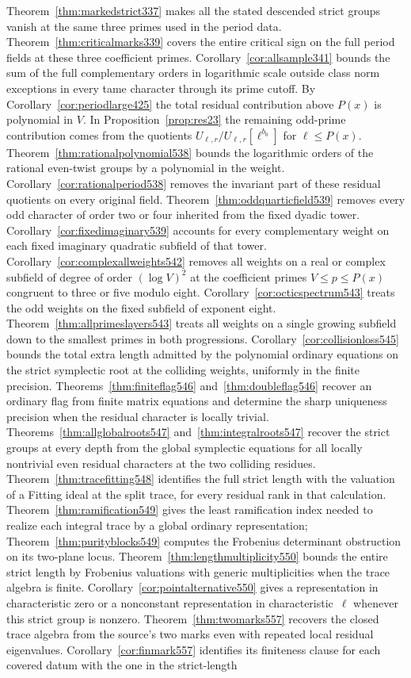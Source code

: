 \documentclass[a4paper,11pt]{article}
\theoremstyle{definition}
\theoremstyle{remark}
\numberwithin{equation}{section}
\begin{document}
Theorem~\ref{thm:markedstrict337} makes all the stated descended strict groups vanish at the same three primes used in the period data. Theorem~\ref{thm:criticalmarks339} covers the entire critical sign on the full period fields at these three coefficient primes. Corollary~\ref{cor:allsample341} bounds the sum of the full complementary orders in logarithmic scale outside class norm exceptions in every tame character through its prime cutoff. By Corollary~\ref{cor:periodlarge425} the total residual contribution above \(P(x)\) is polynomial in \(V\). In Proposition~\ref{prop:res23} the remaining odd-prime contribution comes from the quotients \(U_{\ell,r}/U_{\ell,r}[\ell^{b_0}]\) for \(\ell\le P(x)\). Theorem~\ref{thm:rationalpolynomial538} bounds the logarithmic orders of the rational even-twist groups by a polynomial in the weight. Corollary~\ref{cor:rationalperiod538} removes the invariant part of these residual quotients on every original field. Theorem~\ref{thm:oddquarticfield539} removes every odd character of order two or four inherited from the fixed dyadic tower. Corollary~\ref{cor:fixedimaginary539} accounts for every complementary weight on each fixed imaginary quadratic subfield of that tower. Corollary~\ref{cor:complexallweights542} removes all weights on a real or complex subfield of degree of order \((\log V)^2\) at the coefficient primes \(V\le p\le P(x)\) congruent to three or five modulo eight. Corollary~\ref{cor:octicspectrum543} treats the odd weights on the fixed subfield of exponent eight. Theorem~\ref{thm:allprimeslayers543} treats all weights on a single growing subfield down to the smallest primes in both progressions. Corollary~\ref{cor:collisionloss545} bounds the total extra length admitted by the polynomial ordinary equations on the strict symplectic root at the colliding weights, uniformly in the finite precision. Theorems~\ref{thm:finiteflag546} and~\ref{thm:doubleflag546} recover an ordinary flag from finite matrix equations and determine the sharp uniqueness precision when the residual character is locally trivial. Theorems~\ref{thm:allglobalroots547} and~\ref{thm:integralroots547} recover the strict groups at every depth from the global symplectic equations for all locally nontrivial even residual characters at the two colliding residues. Theorem~\ref{thm:tracefitting548} identifies the full strict length with the valuation of a Fitting ideal at the split trace, for every residual rank in that calculation. Theorem~\ref{thm:ramification549} gives the least ramification index needed to realize each integral trace by a global ordinary representation; Theorem~\ref{thm:purityblocks549} computes the Frobenius determinant obstruction on its two-plane locus. Theorem~\ref{thm:lengthmultiplicity550} bounds the entire strict length by Frobenius valuations with generic multiplicities when the trace algebra is finite. Corollary~\ref{cor:pointalternative550} gives a representation in characteristic zero or a nonconstant representation in characteristic~\(\ell\) whenever this strict group is nonzero. Theorem~\ref{thm:twomarks557} recovers the closed trace algebra from the source's two marks even with repeated local residual eigenvalues. Corollary~\ref{cor:finmark557} identifies its finiteness clause for each covered datum with the one in the strict-length 
\end{document}
